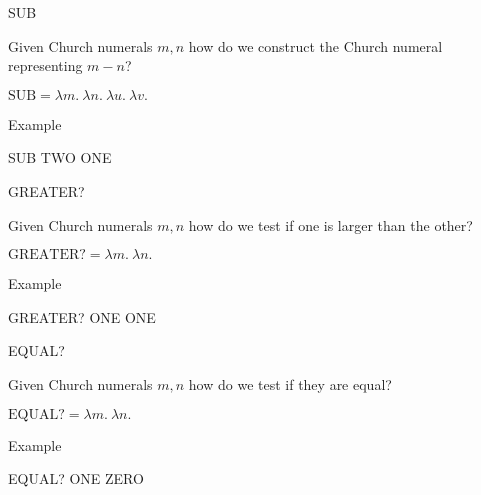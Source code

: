 \documentclass{beamer}
\begin{document}
\begin{frame}{SUB}

  Given Church numerals $m,n$ how do we construct the Church numeral representing $m-n$?
  
  \vspace{0.3cm}
  
  $\text{SUB} = \lambda m. \ \lambda n. \ \lambda u. \ \lambda v. \ $
  
  \vspace{6cm}
  
\end{frame}

\begin{frame}{Example}
  
  SUB TWO ONE
  \vspace{6cm}
       
\end{frame}

\begin{frame}{GREATER?}

  Given Church numerals $m,n$ how do we test if one is larger than the other?
  
  \vspace{0.3cm}
  
  $\text{GREATER?} = \lambda m. \ \lambda n. \ $
  
  \vspace{6cm}  

\end{frame}

\begin{frame}{Example}

  GREATER? ONE ONE
  \vspace{6cm}
  
\end{frame}

\begin{frame}{EQUAL?}

  Given Church numerals $m,n$ how do we test if they are equal?
  
  \vspace{0.3cm}

  $\text{EQUAL?} = \lambda m. \ \lambda n. \ $

\vspace{6cm}      
\end{frame}

\begin{frame}{Example}

  EQUAL? ONE ZERO
  \vspace{6cm}
  
\end{frame}
\end{document}
